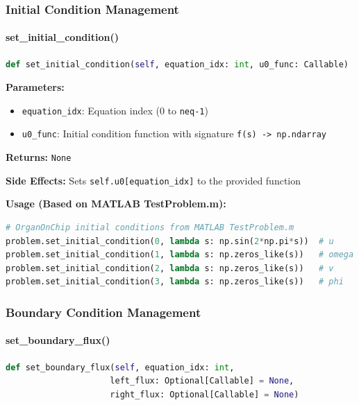 \subsubsection{Initial Condition Management}

\paragraph{set\_initial\_condition()}\leavevmode
\begin{lstlisting}[language=Python, caption=Set Initial Condition Method]
def set_initial_condition(self, equation_idx: int, u0_func: Callable)
\end{lstlisting}

\textbf{Parameters:}
\begin{itemize}
    \item \texttt{equation\_idx}: Equation index (0 to \texttt{neq-1})
    \item \texttt{u0\_func}: Initial condition function with signature \texttt{f(s) -> np.ndarray}
\end{itemize}

\textbf{Returns:} \texttt{None}

\textbf{Side Effects:} Sets \texttt{self.u0[equation\_idx]} to the provided function

\textbf{Usage (Based on MATLAB TestProblem.m):}
\begin{lstlisting}[language=Python, caption=Initial Condition Usage]
# OrganOnChip initial conditions from MATLAB TestProblem.m
problem.set_initial_condition(0, lambda s: np.sin(2*np.pi*s))  # u
problem.set_initial_condition(1, lambda s: np.zeros_like(s))   # omega
problem.set_initial_condition(2, lambda s: np.zeros_like(s))   # v
problem.set_initial_condition(3, lambda s: np.zeros_like(s))   # phi
\end{lstlisting}

\subsubsection{Boundary Condition Management}

\paragraph{set\_boundary\_flux()}\leavevmode
\begin{lstlisting}[language=Python, caption=Set Boundary Flux Method]
def set_boundary_flux(self, equation_idx: int, 
                     left_flux: Optional[Callable] = None,
                     right_flux: Optional[Callable] = None)
\end{lstlisting}

